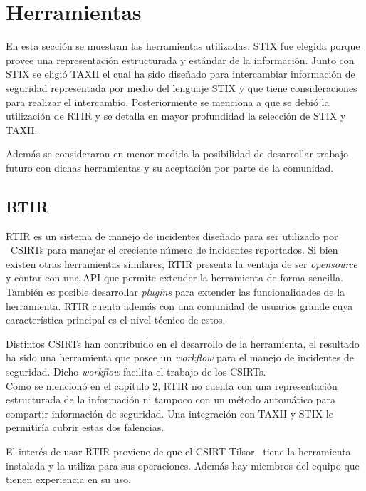 \bigskip

\section{Herramientas}
	En esta sección se muestran las herramientas utilizadas. STIX fue elegida porque provee una representación estructurada
	y estándar de la información. Junto con STIX se eligió TAXII el cual ha sido diseñado para intercambiar información de
	seguridad representada por medio del lenguaje STIX y que tiene consideraciones para realizar el intercambio.
	Posteriormente se menciona a que se debió la utilización de RTIR y se detalla en mayor profundidad la selección de STIX
	y TAXII.\\
	\bigskip

	Además se consideraron en menor medida la posibilidad de desarrollar trabajo futuro con dichas herramientas y su
	aceptación por parte de la comunidad.


\bigskip

\subsection{RTIR}

\bigskip

	RTIR es un sistema de manejo de incidentes diseñado para ser utilizado por \ CSIRTs para manejar el creciente número de
	incidentes reportados. Si bien existen otras herramientas similares, RTIR presenta la ventaja de ser
	\textit{opensource} y contar con una API que permite extender la herramienta de forma sencilla. También es posible
	desarrollar \textit{plugins} para extender las funcionalidades de la herramienta. RTIR cuenta además con una comunidad
	de usuarios grande cuya característica principal es el nivel técnico de estos.\\
	\bigskip

	Distintos CSIRTs han contribuido en el desarrollo de la herramienta, el resultado ha sido una herramienta que posee un
	\textit{workflow} para el manejo de incidentes de seguridad. Dicho \textit{workflow} facilita el trabajo de los
	CSIRTs.\\
\bigskip
	Como se mencionó en el capítulo 2, RTIR no cuenta con una representación estructurada de la información ni tampoco
	con un método automático para compartir información de seguridad. Una integración con TAXII y STIX le permitiría cubrir
	estas dos falencias.


\bigskip

	El interés de usar RTIR proviene de que el CSIRT-Tilsor \ tiene la herramienta instalada y la utiliza para sus
	operaciones. Además hay miembros del equipo que tienen experiencia en su uso.


